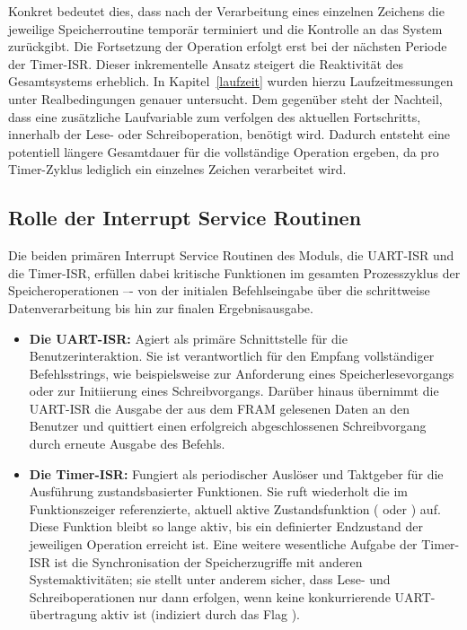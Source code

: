 Konkret bedeutet dies, dass nach der Verarbeitung eines einzelnen Zeichens die jeweilige Speicherroutine tempor\"ar terminiert und die Kontrolle an das System zur\"uckgibt. Die Fortsetzung der Operation erfolgt erst bei der n\"achsten Periode der Timer-ISR. Dieser inkrementelle Ansatz steigert die Reaktivit\"at des Gesamtsystems erheblich. In Kapitel~\ref{laufzeit} wurden hierzu Laufzeitmessungen unter Realbedingungen genauer untersucht. Dem gegen\"uber steht der Nachteil, dass eine zus\"atzliche Laufvariable zum verfolgen des aktuellen Fortschritts, innerhalb der Lese- oder Schreiboperation, ben\"otigt wird. Dadurch entsteht eine potentiell l\"angere Gesamtdauer f\"ur die vollst\"andige Operation ergeben, da pro Timer-Zyklus lediglich ein einzelnes Zeichen verarbeitet wird.\AI

\subsection{Rolle der Interrupt Service Routinen}
\label{LesenSchreiben_Rolle_ISR}

Die beiden prim\"aren Interrupt Service Routinen des Moduls, die UART-ISR und die Timer-ISR, erf\"ullen dabei kritische Funktionen im gesamten Prozesszyklus der Speicheroperationen –- von der initialen Befehlseingabe \"uber die schrittweise Datenverarbeitung bis hin zur finalen Ergebnisausgabe.

\begin{itemize}
	\item \textbf{Die UART-ISR:} Agiert als prim\"are Schnittstelle f\"ur die Benutzerinteraktion. Sie ist verantwortlich f\"ur den Empfang vollst\"andiger Befehlsstrings, wie beispielsweise  zur Anforderung eines Speicherlesevorgangs oder  zur Initiierung eines Schreibvorgangs. Dar\"uber hinaus \"ubernimmt die UART-ISR die Ausgabe der aus dem FRAM gelesenen Daten an den Benutzer und quittiert einen erfolgreich abgeschlossenen Schreibvorgang durch erneute Ausgabe des Befehls.
	
	\item \textbf{Die Timer-ISR:} Fungiert als periodischer Ausl\"oser und Taktgeber f\"ur die Ausf\"uhrung zustandsbasierter Funktionen. Sie ruft wiederholt die im Funktionszeiger  referenzierte, aktuell aktive Zustandsfunktion (\zB {} oder ) auf. Diese Funktion bleibt so lange aktiv, bis ein definierter Endzustand der jeweiligen Operation erreicht ist. Eine weitere wesentliche Aufgabe der Timer-ISR ist die Synchronisation der Speicherzugriffe mit anderen Systemaktivit\"aten; sie stellt unter anderem sicher, dass Lese- und Schreiboperationen nur dann erfolgen, wenn keine konkurrierende UART-\"ubertragung aktiv ist (indiziert durch das Flag ).
	
\end{itemize}

